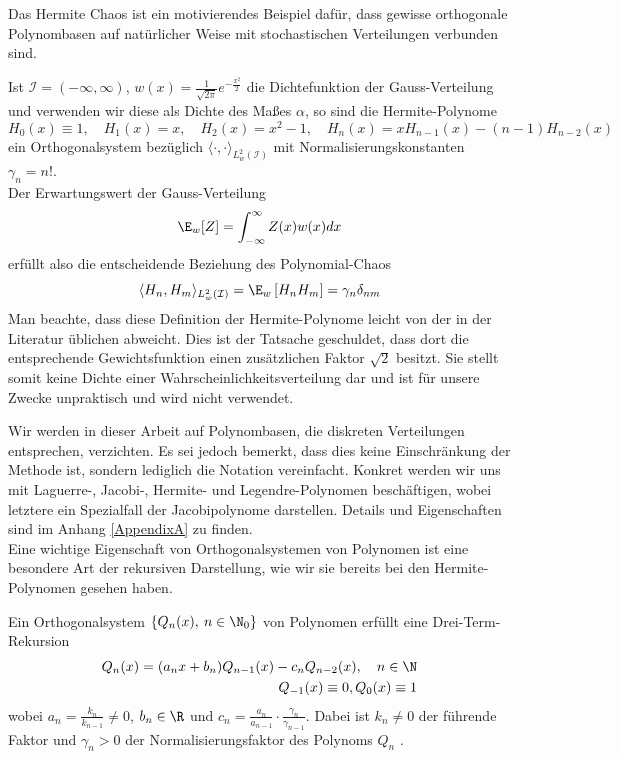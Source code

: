 Das Hermite Chaos ist ein motivierendes Beispiel dafür, dass gewisse orthogonale Polynombasen auf natürlicher Weise mit stochastischen Verteilungen verbunden sind.
\begin{mathbsp}
\label{bsp:hermitechaos}
Ist $\mathcal{I}=(-\infty,\infty)$, $w(x)=\frac{1}{\sqrt{2\pi}}e^{-\frac{x^2}{2}}$ die Dichtefunktion der Gauss-Verteilung und verwenden wir diese als Dichte des Maßes $\alpha$, so sind die Hermite-Polynome
\[H_0(x)\equiv 1,\quad H_1(x)=x,\quad H_2(x)=x^2-1,\quad H_n(x)=xH_{n-1}(x)-(n-1)H_{n-2}(x)\]
ein Orthogonalsystem bezüglich $\langle\cdot,\cdot\rangle_{L_w^2(\mathcal{I})}$ mit Normalisierungskonstanten $\gamma_n=n!$.\\
Der Erwartungswert der Gauss-Verteilung
\[\E_w[Z]= \int_{-\infty}^\infty Z(x)w(x)dx\] erfüllt also die entscheidende Beziehung des Polynomial-Chaos
\[\langle H_n,H_m\rangle_{L_w^2(\mathcal{I})} =\E_w \left[H_nH_m\right]=\gamma_n\delta_{nm}\]
Man beachte, dass diese Definition der Hermite-Polynome leicht von der in der Literatur üblichen abweicht. Dies ist der Tatsache geschuldet, dass dort die entsprechende Gewichtsfunktion einen zusätzlichen Faktor $\sqrt{2}$ besitzt. Sie stellt somit keine Dichte einer Wahrscheinlichkeitsverteilung dar und ist für unsere Zwecke unpraktisch und wird nicht verwendet. 
\end{mathbsp}
Wir werden in dieser Arbeit auf Polynombasen, die diskreten Verteilungen entsprechen, verzichten. Es sei jedoch bemerkt, dass dies keine Einschränkung der Methode ist, sondern lediglich die Notation vereinfacht. Konkret werden wir uns mit Laguerre-, Jacobi-, Hermite- und Legendre-Polynomen beschäftigen, wobei letztere ein Spezialfall der Jacobipolynome darstellen. Details und Eigenschaften sind im Anhang \ref{AppendixA} zu finden.\\[0.3cm]
Eine wichtige Eigenschaft von Orthogonalsystemen von Polynomen ist eine besondere Art der rekursiven Darstellung, wie wir sie bereits bei den Hermite-Polynomen gesehen haben.
\begin{maththeorem}
\label{threetermexist}
Ein Orthogonalsystem $\left\lbrace Q_n(x),\: n\in\N_0\right\rbrace$ von Polynomen erfüllt eine Drei-Term-Rekursion
\begin{eqnarray}
Q_n(x)=(a_nx+b_n)Q_{n-1}(x)-c_nQ_{n-2}(x),\quad n\in\N\\
Q_{-1}(x)\equiv 0, Q_0(x)\equiv 1\nonumber
\end{eqnarray}
wobei $a_n=\frac{k_n}{k_{n-1}}\neq 0$, $b_n\in\R$ und $c_n=\frac{a_n}{a_{n-1}}\cdot \frac{\gamma_n}{\gamma_{n-1}}$.
Dabei ist $k_n\neq 0$ der führende Faktor und $\gamma_n>0$ der Normalisierungsfaktor des Polynoms $Q_n$ . 
\end{maththeorem}
